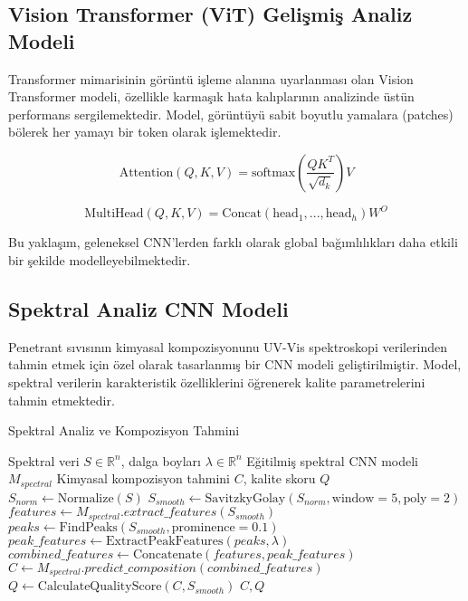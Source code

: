 \documentclass[12pt,a4paper]{article}
\begin{document}
\subsection{Vision Transformer (ViT) Gelişmiş Analiz Modeli}

Transformer mimarisinin görüntü işleme alanına uyarlanması olan Vision Transformer modeli, özellikle karmaşık hata kalıplarının analizinde üstün performans sergilemektedir. Model, görüntüyü sabit boyutlu yamalara (patches) bölerek her yamayı bir token olarak işlemektedir.

\begin{equation}
\text{Attention}(Q, K, V) = \text{softmax}\left(\frac{QK^T}{\sqrt{d_k}}\right)V
\end{equation}

\begin{equation}
\text{MultiHead}(Q, K, V) = \text{Concat}(\text{head}_1, ..., \text{head}_h)W^O
\end{equation}

Bu yaklaşım, geleneksel CNN'lerden farklı olarak global bağımlılıkları daha etkili bir şekilde modelleyebilmektedir.

\subsection{Spektral Analiz CNN Modeli}

Penetrant sıvısının kimyasal kompozisyonunu UV-Vis spektroskopi verilerinden tahmin etmek için özel olarak tasarlanmış bir CNN modeli geliştirilmiştir. Model, spektral verilerin karakteristik özelliklerini öğrenerek kalite parametrelerini tahmin etmektedir.

\begin{algorithm}[h]
\caption{Spektral Analiz ve Kompozisyon Tahmini}
\begin{algorithmic}[1]
\REQUIRE Spektral veri $S \in \mathbb{R}^{n}$, dalga boyları $\lambda \in \mathbb{R}^{n}$
\REQUIRE Eğitilmiş spektral CNN modeli $M_{spectral}$
\ENSURE Kimyasal kompozisyon tahmini $C$, kalite skoru $Q$
\STATE $S_{norm} \leftarrow \text{Normalize}(S)$
\STATE $S_{smooth} \leftarrow \text{SavitzkyGolay}(S_{norm}, \text{window}=5, \text{poly}=2)$
\STATE $features \leftarrow M_{spectral}.extract\_features(S_{smooth})$
\STATE $peaks \leftarrow \text{FindPeaks}(S_{smooth}, \text{prominence}=0.1)$
\STATE $peak\_features \leftarrow \text{ExtractPeakFeatures}(peaks, \lambda)$
\STATE $combined\_features \leftarrow \text{Concatenate}(features, peak\_features)$
\STATE $C \leftarrow M_{spectral}.predict\_composition(combined\_features)$
\STATE $Q \leftarrow \text{CalculateQualityScore}(C, S_{smooth})$
\RETURN $C, Q$
\end{algorithmic}
\end{algorithm}
\end{document}
